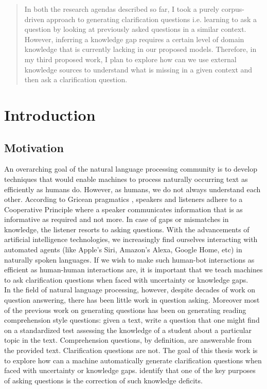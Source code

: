 \documentclass[11pt]{report}
\begin{document}
\begin{abstract}
In both the research agendas described so far, I took a purely corpus-driven approach to generating clarification questions i.e. learning to ask a question by looking at previously asked questions in a similar context. However, inferring a knowledge gap requires a certain level of domain knowledge that is currently lacking in our proposed models. Therefore, in my third proposed work, I plan to explore how can we use external knowledge sources to understand what is missing in a given context and then ask a clarification question. 

\end{abstract}

\pagebreak

\tableofcontents
\pagebreak

\cleardoublepage
{}


\chapter{Introduction}

\section{Motivation}

An overarching goal of the natural language processing community is to develop techniques that would enable machines to process naturally occurring text as efficiently as humans do. However, as humans, we do not always understand each other. According to Gricean pragmatics \cite{grice1975logic}, speakers and listeners adhere to a Cooperative Principle where a speaker communicates information that is as informative as required and not more. In case of gaps or mismatches in knowledge, the listener resorts to asking questions. With the advancements of artificial intelligence technologies, we increasingly find ourselves interacting with automated agents (like Apple's Siri, Amazon's Alexa, Google Home, etc) in naturally spoken languages. If we wish to make such human-bot interactions as efficient as human-human interactions are, it is important that we teach machines to ask clarification questions when faced with uncertainty or knowledge gaps.\\

\noindent
In the field of natural language processing, however, despite decades of work on question answering, there has been little work in question asking. Moreover most of the previous work on generating questions has been on generating reading comprehension style questions: given a text, write a question that one might find on a standardized test assessing the knowledge of a student about a particular topic in the text. Comprehension questions, by definition, are answerable from the provided text. Clarification questions are not. The goal of this thesis work is to explore how can a machine automatically generate clarification questions when faced with uncertainty or knowledge gaps. \cite{graesser2008question} identify that one of the key purposes of asking questions is the correction of such knowledge deficits.
\end{document}
